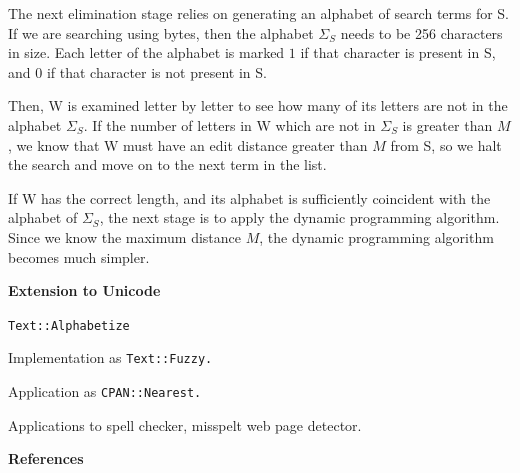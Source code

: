 \documentclass{article}
\begin{document}
The next elimination stage relies on generating an alphabet of search
terms for S. If we are searching using bytes, then the alphabet
$\Sigma_S$ needs to be 256 characters in size. Each letter of the
alphabet is marked $1$ if that character is present in S, and $0$ if
that character is not present in S.

Then, W is examined letter by letter to see how many of its letters
are not in the alphabet $\Sigma_S$. If the number of letters in W
which are not in $\Sigma_S$ is greater than $M$, we know that W must
have an edit distance greater than $M$ from S, so we halt the search
and move on to the next term in the list.

If W has the correct length, and its alphabet is sufficiently
coincident with the alphabet of $\Sigma_S$, the next stage is to apply
the dynamic programming algorithm. Since we know the maximum distance
$M$, the dynamic programming algorithm becomes much simpler.

\bf
Extension to Unicode
\rm

\tt Text::Alphabetize \rm

Implementation as \tt Text::Fuzzy\rm.

Application as \tt CPAN::Nearest\rm.

Applications to spell checker, misspelt web page detector.

\bf
References
\rm
\end{document}
